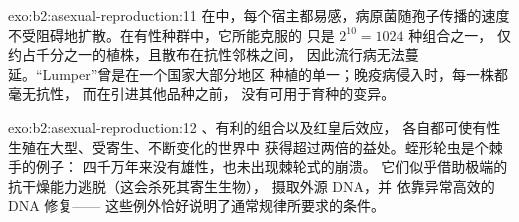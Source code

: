 \begin{solution}{exo:b2:asexual-reproduction:11}
在中，每个宿主都易感，病原菌随孢子传播的速度
不受阻碍地扩散。在有性种群中，它所能克服的
只是 $2^{10} = 1024$ 种组合之一，
仅约占千分之一的植株，且散布在抗性邻株之间，
因此流行病无法蔓延。“Lumper”曾是在一个国家大部分地区
种植的单一；晚疫病侵入时，每一株都毫无抗性，
而在引进其他品种之前，
没有可用于育种的变异。
\end{solution}

\begin{solution}{exo:b2:asexual-reproduction:12}
、有利的组合以及红皇后效应，
各自都可使有性生殖在大型、受寄生、不断变化的世界中
获得超过两倍的益处。蛭形轮虫是个棘手的例子：
四千万年来没有雄性，也未出现棘轮式的崩溃。
它们似乎借助极端的抗干燥能力逃脱（这会杀死其寄生生物），
摄取外源 DNA，并
依靠异常高效的 DNA 修复——
这些例外恰好说明了通常规律所要求的条件。
\end{solution}

